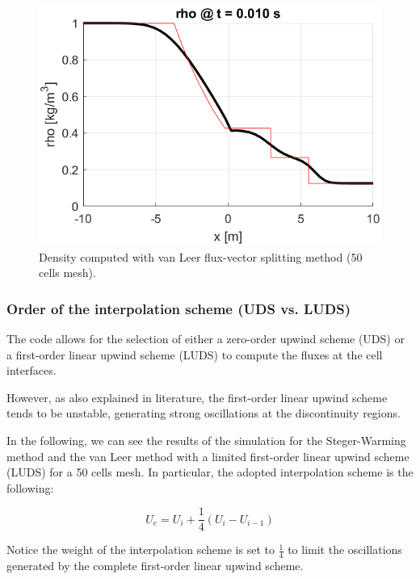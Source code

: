 \begin{figure}[H]
    \centering
    \includegraphics[width=.6\textwidth]{img/VL50_rho.png}
    \caption{Density computed with van Leer flux-vector splitting method (50 cells mesh).}
    \label{fig:VL50_zoom}
\end{figure}


\subsubsection{Order of the interpolation scheme (UDS vs. LUDS)}

The code allows for the selection of either a zero-order upwind scheme (UDS) or a first-order linear upwind scheme (LUDS) to compute the fluxes at the cell interfaces.

However, as also explained in literature, the first-order linear upwind scheme tends to be unstable, generating strong oscillations at the discontinuity regions.

In the following, we can see the results of the simulation for the Steger-Warming method and the van Leer method with a limited first-order linear upwind scheme (LUDS) for a 50 cells mesh.
In particular, the adopted interpolation scheme is the following:

\begin{equation}
    U_e = U_i + \frac{1}{4} \left( U_i - U_{i-1} \right)
\end{equation}

Notice the weight of the interpolation scheme is set to $\frac{1}{4}$ to limit the oscillations generated by the complete first-order linear upwind scheme.

